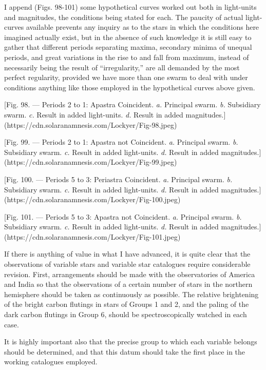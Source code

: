 \documentclass[a4paper, 12pt, oneside, polutonikogreek, english]{article}
\begin{document}
I append (Figs. 98-101) some hypothetical curves worked out both in light-units and magnitudes, the conditions being stated for each. The paucity of actual light-curves available prevents any inquiry as to the stars in which the conditions here imagined actually exist, but in the absence of such knowledge it is still easy to gather that different periods separating maxima, secondary minima of unequal periods, and great variations in the rise to and fall from maximum, instead of necessarily being the result of ``irregularity,'' are all demanded by the most perfect regularity, provided we have more than one swarm to deal with under conditions anything like those employed in the hypothetical curves above given.

[Fig. 98. --- Periods 2 to 1: Apastra Coincident. \emph{a.} Principal swarm. \emph{b.} Subsidiary swarm. \emph{c.} Result in added light-units. \emph{d.} Result in added magnitudes.](https://cdn.solaranamnesis.com/Lockyer/Fig-98.jpeg)

[Fig. 99. --- Periods 2 to 1: Apastra not Coincident. \emph{a.} Principal swarm. \emph{b.} Subsidiary swarm. \emph{c.} Result in added light-units. \emph{d.} Result in added magnitudes.](https://cdn.solaranamnesis.com/Lockyer/Fig-99.jpeg)

[Fig. 100. --- Periods 5 to 3: Periastra Coincident. \emph{a.} Principal swarm. \emph{b.} Subsidiary swarm. \emph{c.} Result in added light-units. \emph{d.} Result in added magnitudes.](https://cdn.solaranamnesis.com/Lockyer/Fig-100.jpeg)

[Fig. 101. --- Periods 5 to 3: Apastra not Coincident. \emph{a.} Principal swarm. \emph{b.} Subsidiary swarm. \emph{c.} Result in added light-units. \emph{d.} Result in added magnitudes.](https://cdn.solaranamnesis.com/Lockyer/Fig-101.jpeg)

If there is anything of value in what I have advanced, it is quite clear that the observations of variable stars and variable star catalogues require considerable revision. First, arrangements should be made with the observatories of America and India so that the observations of a certain number of stars in the northern hemisphere should be taken as continuously as possible. The relative brightening of the bright carbon flutings in stars of Groups 1 and 2, and the paling of the dark carbon flutings in Group 6, should be spectroscopically watched in each case.

It is highly important also that the precise group to which each variable belongs should be determined, and that this datum should take the first place in the working catalogues employed.
\clearpage
\end{document}
